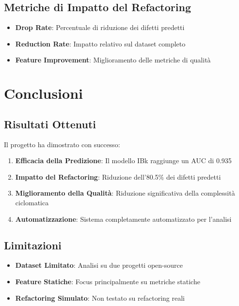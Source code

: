 \documentclass[12pt,a4paper]{article}
\begin{document}
\subsection{Metriche di Impatto del Refactoring}

\begin{itemize}
    \item \textbf{Drop Rate}: Percentuale di riduzione dei difetti predetti
    \item \textbf{Reduction Rate}: Impatto relativo sul dataset completo
    \item \textbf{Feature Improvement}: Miglioramento delle metriche di qualità
\end{itemize}

\section{Conclusioni}

\subsection{Risultati Ottenuti}

Il progetto ha dimostrato con successo:

\begin{enumerate}
    \item \textbf{Efficacia della Predizione}: Il modello IBk raggiunge un AUC di 0.935
    \item \textbf{Impatto del Refactoring}: Riduzione dell'80.5\% dei difetti predetti
    \item \textbf{Miglioramento della Qualità}: Riduzione significativa della complessità ciclomatica
    \item \textbf{Automatizzazione}: Sistema completamente automatizzato per l'analisi
\end{enumerate}

\subsection{Limitazioni}

\begin{itemize}
    \item \textbf{Dataset Limitato}: Analisi su due progetti open-source
    \item \textbf{Feature Statiche}: Focus principalmente su metriche statiche
    \item \textbf{Refactoring Simulato}: Non testato su refactoring reali
\end{itemize}
\end{document}

